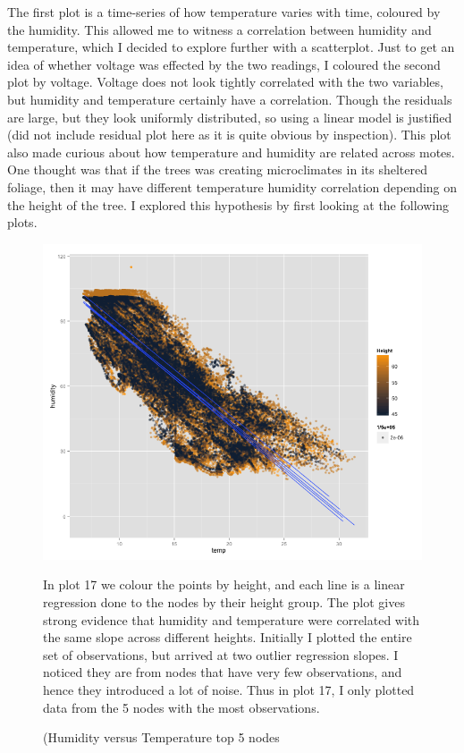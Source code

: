 \documentclass[english]{article}\usepackage[]{graphicx}\usepackage[]{color}
\begin{document}
The first plot is a time-series of how temperature varies with time, coloured by the humidity.  This allowed me to witness a correlation between humidity and temperature, which I decided to explore further with a scatterplot.   Just to get an idea of whether voltage was effected by the two readings, I coloured the second plot by voltage.  Voltage does not look tightly correlated with the two variables, but humidity and temperature certainly have a correlation.  Though the residuals are large, but they look uniformly distributed, so using a linear model is justified (did not include residual plot here as it is quite obvious by inspection).  This plot also made curious about how temperature and humidity are related across motes. One thought was that if the trees was creating microclimates in its sheltered foliage, then it may have different temperature humidity correlation depending on the height of the tree.  I explored this hypothesis by first looking at the following plots. 

\begin{figure}[H]
\centering
\begin{minipage}{.60\textwidth}
\centering
\includegraphics[width=\linewidth]{top5humidtemp}
\caption{(Humidity versus Temperature top 5 nodes}
\label{fig:test1}
\end{minipage}\hfill
\begin{minipage}{.40\textwidth}

In plot 17 we colour the points by height, and each line is a linear regression done to the nodes by their height group.  The plot gives strong evidence that humidity and temperature were correlated with the same slope across different heights. Initially I plotted the entire set of observations, but arrived at two outlier regression slopes.  I noticed they are from nodes that have very few observations, and hence they introduced a lot of noise.  Thus in plot 17, I only plotted data from the 5 nodes with the most observations.  

\end{minipage}
\end{figure}
\end{document}
